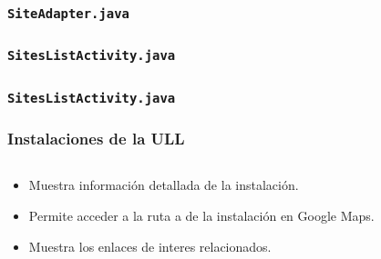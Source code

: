 \begin{frame}
	\frametitle{\texttt{SiteAdapter.java}}
	
\end{frame} 
 

\begin{frame}
	\frametitle{\texttt{SitesListActivity.java}}
	
\end{frame}  

\begin{frame}
	\frametitle{\texttt{SitesListActivity.java}}
	
\end{frame}  


\begin{frame}
	\frametitle{Instalaciones de la ULL}
	\begin{columns}
		\begin{column}{0.6\textwidth}
			\begin{itemize}
				\item Muestra información detallada de la instalación.
				\item Permite acceder a la ruta a de la instalación en Google Maps.
				\item Muestra los enlaces de interes relacionados.
			\end{itemize}
			\endblock{}
		\end{column}
		\begin{column}{0.4\textwidth} 
			\vfill 
			\begin{center}

\end{center}
\end{column}
\end{columns}
\end{frame}

